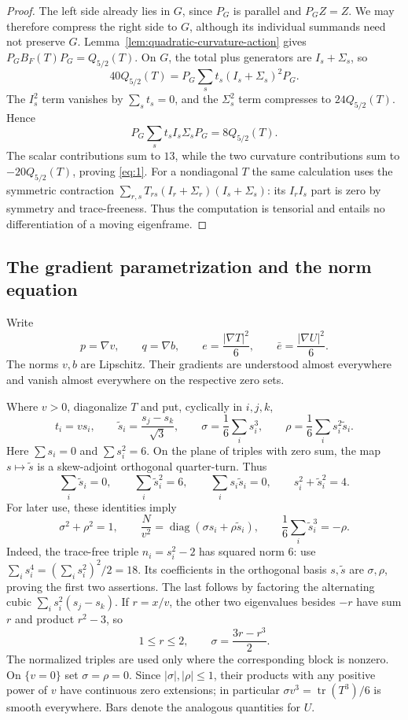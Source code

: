 \begin{proof}
The left side already lies in $G$, since $P_G$ is parallel and
$P_GZ=Z$. We may therefore compress the right side to $G$,
although its individual summands need not preserve $G$.
Lemma~\ref{lem:quadratic-curvature-action} gives
$P_GB_F(T)P_G=Q_{5/2}(T)$. On $G$, the total plus generators are
$I_s+\Sigma_s$, so
\[
 40Q_{5/2}(T)
 =P_G\sum_s t_s(I_s+\Sigma_s)^2P_G.
\]
The $I_s^2$ term vanishes by $\sum_s t_s=0$, and the $\Sigma_s^2$
term compresses to $24Q_{5/2}(T)$. Hence
\[
 P_G\sum_s t_s I_s\Sigma_sP_G=8Q_{5/2}(T).
\]
The scalar contributions sum to $13$, while the two curvature
contributions sum to $-20Q_{5/2}(T)$, proving \eqref{eq:1}.
For a nondiagonal $T$ the same calculation uses the symmetric
contraction $\sum_{r,s}T_{rs}(I_r+\Sigma_r)(I_s+\Sigma_s)$:
its $I_rI_s$ part is zero by symmetry and trace-freeness.
Thus the computation is tensorial and entails no differentiation
of a moving eigenframe.
\end{proof}

\subsection{The gradient parametrization and the norm equation}

Write
\[
 p=\nabla v,\qquad q=\nabla b,\qquad
 e=\frac{|\nabla T|^2}{6},\qquad
 \bar e=\frac{|\nabla U|^2}{6}.
\]
The norms $v,b$ are Lipschitz. Their gradients are understood almost
everywhere and vanish almost everywhere on the respective zero sets.

Where $v>0$, diagonalize $T$ and put, cyclically in $i,j,k$,
\[
 t_i=vs_i,\qquad
 \widetilde s_i=\frac{s_j-s_k}{\sqrt3},\qquad
 \sigma=\frac16\sum_i s_i^3,\qquad
 \rho=\frac16\sum_i s_i^2\widetilde s_i.
\]
Here $\sum s_i=0$ and $\sum s_i^2=6$. On the plane of triples with
zero sum, the map $s\mapsto\widetilde s$ is a skew-adjoint orthogonal
quarter-turn. Thus
\[
 \sum_i\widetilde s_i=0,\qquad
 \sum_i\widetilde s_i^2=6,\qquad
 \sum_i s_i\widetilde s_i=0,\qquad
 s_i^2+\widetilde s_i^2=4.
\]
For later use, these identities imply
\[
 \sigma^2+\rho^2=1,\qquad
 \frac{N}{v^2}
   =\operatorname{diag}(\sigma s_i+\rho\widetilde s_i),
 \qquad
 \frac16\sum_i\widetilde s_i^3=-\rho.
\]
Indeed, the trace-free triple $n_i=s_i^2-2$ has squared norm $6$:
use $\sum_i s_i^4=(\sum_i s_i^2)^2/2=18$.
Its coefficients in the orthogonal basis $s,\widetilde s$ are
$\sigma,\rho$, proving the first two assertions. The last follows
by factoring the alternating cubic
$\sum_i s_i^2(s_j-s_k)$. If $r=x/v$, the other two eigenvalues
besides $-r$ have sum $r$ and product $r^2-3$, so
\[
 1\le r\le2,\qquad
 \sigma=\frac{3r-r^3}{2}.
\]
The normalized triples are used only where the corresponding block
is nonzero. On $\{v=0\}$ set $\sigma=\rho=0$. Since
$|\sigma|,|\rho|\le1$, their products with any positive power of $v$
have continuous zero extensions; in particular
$\sigma v^3=\operatorname{tr}(T^3)/6$ is smooth everywhere.
Bars denote the analogous quantities for $U$.

